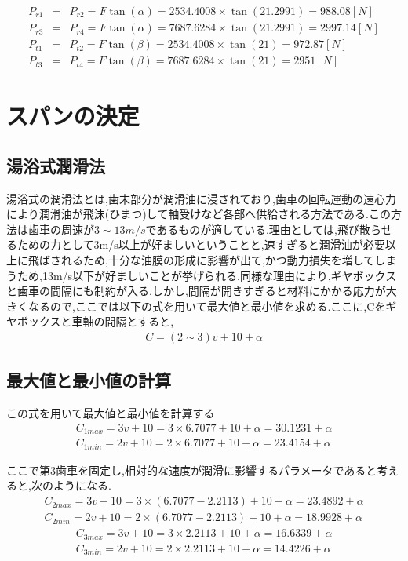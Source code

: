\begin{eqnarray}
P_{r1} &=&P_{r2} = F\tan(\alpha) = 2534.4008 \times \tan(21.2991) = 988.08[N]\\
P_{r3} &=&P_{r4} = F\tan(\alpha) = 7687.6284 \times \tan(21.2991) = 2997.14[N]\\
P_{t1} &=&P_{t2} = F\tan(\beta) = 2534.4008 \times \tan(21) = 972.87[N]\\
P_{t3} &=&P_{t4} = F\tan(\beta) = 7687.6284 \times \tan(21) = 2951[N]
\end{eqnarray}

\section{スパンの決定}
\subsection{湯浴式潤滑法}
湯浴式の潤滑法とは,歯末部分が潤滑油に浸されており,歯車の回転運動の遠心力により潤滑油が飛沫(ひまつ)して軸受けなど各部へ供給される方法である.この方法は歯車の周速が$3\sim13m/s$であるものが適している.理由としては,飛び散らせるための力として3m/s以上が好ましいということと,速すぎると潤滑油が必要以上に飛ばされるため,十分な油膜の形成に影響が出て,かつ動力損失を増してしまうため,13m/s以下が好ましいことが挙げられる.同様な理由により,ギヤボックスと歯車の間隔にも制約が入る.しかし,間隔が開きすぎると材料にかかる応力が大きくなるので,ここでは以下の式を用いて最大値と最小値を求める.ここに,Cをギヤボックスと車軸の間隔とすると,
\begin{eqnarray}
C=(2\sim3)v+10 + \alpha
\end{eqnarray}
\subsection{最大値と最小値の計算}
この式を用いて最大値と最小値を計算する
\begin{eqnarray}
C_{1max}=3v+10=3 \times 6.7077 + 10 +\alpha = 30.1231 +\alpha\\
C_{1min}=2v+10=2 \times 6.7077 + 10 +\alpha = 23.4154 +\alpha
\end{eqnarray}
\par
ここで第3歯車を固定し,相対的な速度が潤滑に影響するパラメータであると考えると,次のようになる.
\begin{eqnarray}
C_{2max}=3v+10=3 \times (6.7077-2.2113) + 10 +\alpha = 23.4892 +\alpha\\
C_{2min}=2v+10=2 \times (6.7077-2.2113) + 10 +\alpha = 18.9928 +\alpha
\end{eqnarray}
\begin{eqnarray}
C_{3max}=3v+10=3 \times 2.2113 + 10 +\alpha = 16.6339 +\alpha\\
C_{3min}=2v+10=2 \times 2.2113 + 10 +\alpha = 14.4226 +\alpha
\end{eqnarray}

